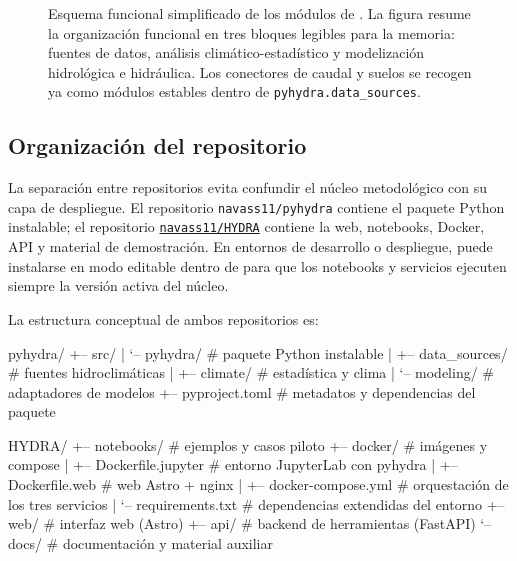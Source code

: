 \begin{figure}[p]
{
}
\caption{Esquema funcional simplificado de los módulos de \pyhydra. La figura resume la organización funcional en tres bloques legibles para la memoria: fuentes de datos, análisis climático-estadístico y modelización hidrológica e hidráulica. Los conectores de caudal y suelos se recogen ya como módulos estables dentro de \texttt{pyhydra.data\_sources}.}
\label{fig:organizacion_modulos_presentacion}
\end{figure}

\subsection{Organización del repositorio}
\label{subsec:estructura_repo}

La separación entre repositorios evita confundir el núcleo metodológico con su capa de despliegue. El repositorio \texttt{navass11/pyhydra} contiene el paquete Python instalable; el repositorio \href{https://github.com/navass11/HYDRA}{\texttt{navass11/HYDRA}} contiene la web, notebooks, Docker, API y material de demostración. En entornos de desarrollo o despliegue, \pyhydra puede instalarse en modo editable dentro de \hydra para que los notebooks y servicios ejecuten siempre la versión activa del núcleo.

La estructura conceptual de ambos repositorios es:

\begin{codeblock}
pyhydra/
+-- src/
|   `-- pyhydra/                 # paquete Python instalable
|       +-- data_sources/        # fuentes hidroclimáticas
|       +-- climate/             # estadística y clima
|       `-- modeling/            # adaptadores de modelos
+-- pyproject.toml               # metadatos y dependencias del paquete

HYDRA/
+-- notebooks/                   # ejemplos y casos piloto
+-- docker/                      # imágenes y compose
|   +-- Dockerfile.jupyter       # entorno JupyterLab con pyhydra
|   +-- Dockerfile.web           # web Astro + nginx
|   +-- docker-compose.yml       # orquestación de los tres servicios
|   `-- requirements.txt        # dependencias extendidas del entorno
+-- web/                         # interfaz web (Astro)
+-- api/                         # backend de herramientas (FastAPI)
`-- docs/                        # documentación y material auxiliar
\end{codeblock}

